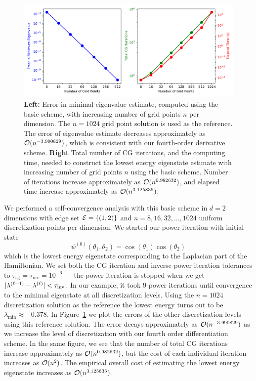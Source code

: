\documentclass{amsart}
\begin{document}
\begin{figure}
  \centering
  \includegraphics[width=\textwidth]{figures/2d_basic_self_convergence_analysis.pdf}
  \caption{\textbf{Left:} Error in minimal eigenvalue estimate, computed using
  the basic scheme, with increasing number of grid points $n$ per dimension.
  The $n = 1024$ grid point solution is used as the reference. The error of
  eigenvalue estimate decreases approximately as $\mathcal{O}(n^{-3.990829})$, which
  is consistent with our fourth-order derivative scheme. \textbf{Right} Total
  number of CG iterations, and the computing time, needed to construct the
  lowest energy eigenstate estimate with increasing number of grid points $n$
  using the basic scheme. Number of iterations increase approximately as
  $\mathcal{O}(n^{0.982632})$, and elapsed time increase approximately as
  $\mathcal{O}(n^{3.125835})$.}
  \label{fig:2d-basic-self-convergence-analysis}
\end{figure}

We performed a self-convergence analysis with this basic scheme in $d = 2$
dimensions with edge set $\mathcal{E} = \{(1, 2)\}$ and $n = 8, 16, 32, \ldots, 1024$
uniform discretization points per dimension. We started our power iteration
with initial state
\begin{equation}
  \psi^{(0)}(\theta_1, \theta_2) = \cos(\theta_1) \cos(\theta_2)
\end{equation}
which is the lowest energy eigenstate corresponding to the Laplacian part of
the Hamiltonian. We set both the CG iteration and inverse power iteration
tolerances to $\tau_\text{cg} = \tau_\text{inv} = 10^{-6}$ --- the power
iteration is stopped when we get $\lvert\lambda^{(\ell + 1)} - \lambda^{(\ell)}\rvert
< \tau_\text{inv}$. In our example, it took 9 power iterations until
convergence to the minimal eigenstate at all discretization levels. Using the
$n = 1024$ discretization solution as the reference the lowest energy turns out
to be $\lambda_\text{min} \approx -0.378$. In
Figure~\ref{fig:2d-basic-self-convergence-analysis} we plot the errors of the
other discretization levels using this reference solution. The error decays
approximately as $\mathcal{O}(n^{-3.990829})$ as we increase the level of
discretization with our fourth order differentiation scheme. In the same
figure, we see that the number of total CG iterations increase approximately as
$\mathcal{O}(n^{0.982632})$, but the cost of each individual iteration increases as
$\mathcal{O}(n^2)$. The empirical overall cost of estimating the lowest energy
eigenstate increases as $\mathcal{O}(n^{3.125835})$.
\end{document}

